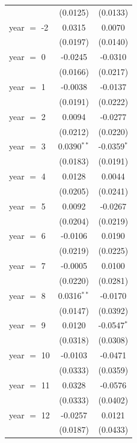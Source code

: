 \begin{tabular}{lcc}
                   & (0.0125)        & (0.0133)\\   
   year $=$ -2     & 0.0315          & 0.0070\\   
                   & (0.0197)        & (0.0140)\\   
   year $=$ 0      & -0.0245         & -0.0310\\   
                   & (0.0166)        & (0.0217)\\   
   year $=$ 1      & -0.0038         & -0.0137\\   
                   & (0.0191)        & (0.0222)\\   
   year $=$ 2      & 0.0094          & -0.0277\\   
                   & (0.0212)        & (0.0220)\\   
   year $=$ 3      & 0.0390$^{**}$   & -0.0359$^{*}$\\   
                   & (0.0183)        & (0.0191)\\   
   year $=$ 4      & 0.0128          & 0.0044\\   
                   & (0.0205)        & (0.0241)\\   
   year $=$ 5      & 0.0092          & -0.0267\\   
                   & (0.0204)        & (0.0219)\\   
   year $=$ 6      & -0.0106         & 0.0190\\   
                   & (0.0219)        & (0.0225)\\   
   year $=$ 7      & -0.0005         & 0.0100\\   
                   & (0.0220)        & (0.0281)\\   
   year $=$ 8      & 0.0316$^{**}$   & -0.0170\\   
                   & (0.0147)        & (0.0392)\\   
   year $=$ 9      & 0.0120          & -0.0547$^{*}$\\   
                   & (0.0318)        & (0.0308)\\   
   year $=$ 10     & -0.0103         & -0.0471\\   
                   & (0.0333)        & (0.0359)\\   
   year $=$ 11     & 0.0328          & -0.0576\\   
                   & (0.0333)        & (0.0402)\\   
   year $=$ 12     & -0.0257         & 0.0121\\   
                   & (0.0187)        & (0.0433)\\   

\end{tabular}
